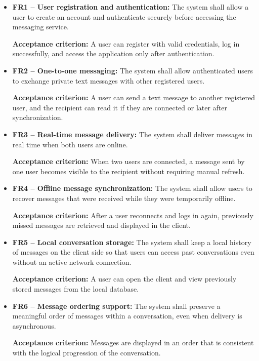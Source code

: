 \documentclass{scrartcl}
\begin{document}
\begin{itemize}
	\item \textbf{FR1 -- User registration and authentication:} The system shall allow a user to create an account and authenticate securely before accessing the messaging service.
	
	\textbf{Acceptance criterion:} A user can register with valid credentials, log in successfully, and access the application only after authentication.
	
	\item \textbf{FR2 -- One-to-one messaging:} The system shall allow authenticated users to exchange private text messages with other registered users.
	
	\textbf{Acceptance criterion:} A user can send a text message to another registered user, and the recipient can read it if they are connected or later after synchronization.
	
	\item \textbf{FR3 -- Real-time message delivery:} The system shall deliver messages in real time when both users are online.
	
	\textbf{Acceptance criterion:} When two users are connected, a message sent by one user becomes visible to the recipient without requiring manual refresh.
	
	\item \textbf{FR4 -- Offline message synchronization:} The system shall allow users to recover messages that were received while they were temporarily offline.
	
	\textbf{Acceptance criterion:} After a user reconnects and logs in again, previously missed messages are retrieved and displayed in the client.
	
	\item \textbf{FR5 -- Local conversation storage:} The system shall keep a local history of messages on the client side so that users can access past conversations even without an active network connection.
	
	\textbf{Acceptance criterion:} A user can open the client and view previously stored messages from the local database.
	
	\item \textbf{FR6 -- Message ordering support:} The system shall preserve a meaningful order of messages within a conversation, even when delivery is asynchronous.
	
	\textbf{Acceptance criterion:} Messages are displayed in an order that is consistent with the logical progression of the conversation.
\end{itemize}
\end{document}
